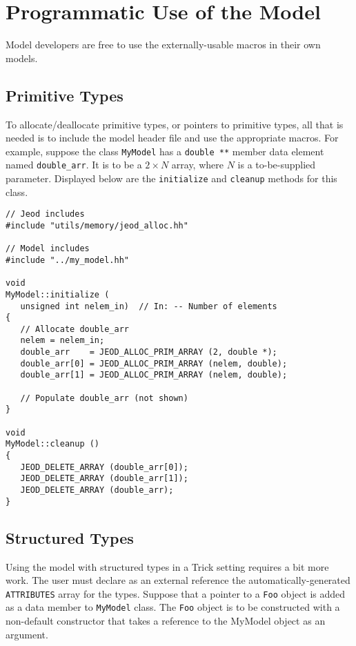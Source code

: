 \section{Programmatic Use of the Model}
Model developers are free to use the externally-usable macros in their own
models.

\subsection{Primitive Types}
To allocate/deallocate primitive types, or pointers to primitive types,
all that is needed is to include the model header file and use the appropriate
macros. For example, suppose the class {\tt MyModel} has a {\tt double **}
member data element named {\tt double\_arr}. It is to be a $2\times N$ array,
where $N$ is a to-be-supplied parameter. Displayed below are the
{\tt initialize} and {\tt cleanup} methods for this class.


\begin{verbatim}
// Jeod includes
#include "utils/memory/jeod_alloc.hh"

// Model includes
#include "../my_model.hh"

void
MyModel::initialize (
   unsigned int nelem_in)  // In: -- Number of elements
{
   // Allocate double_arr
   nelem = nelem_in;
   double_arr    = JEOD_ALLOC_PRIM_ARRAY (2, double *);
   double_arr[0] = JEOD_ALLOC_PRIM_ARRAY (nelem, double);
   double_arr[1] = JEOD_ALLOC_PRIM_ARRAY (nelem, double);

   // Populate double_arr (not shown)
}

void
MyModel::cleanup ()
{
   JEOD_DELETE_ARRAY (double_arr[0]);
   JEOD_DELETE_ARRAY (double_arr[1]);
   JEOD_DELETE_ARRAY (double_arr);
}
\end{verbatim}


\subsection{Structured Types}
Using the model with structured types in a Trick setting requires a
bit more work. The user must declare as an external reference the
automatically-generated {\tt ATTRIBUTES} array for the types.
Suppose that a pointer to a {\tt Foo} object is added as a data
member to {\tt MyModel} class. The {\tt Foo} object is to be constructed
with a non-default constructor that takes a reference to the MyModel object
as an argument.

